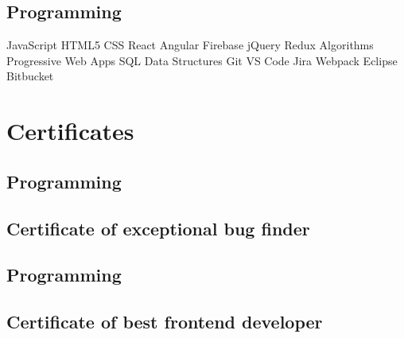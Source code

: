 \documentclass{resumecustom}%
\begin{document}
\begin{minipage}[t]{0.31\textwidth}
\subsection{Programming}
%
\textbf{}%
JavaScript \textbullet{} HTML5 \textbullet{} CSS \textbullet{} React \textbullet{} Angular%
\vspace{5pt}%
\newline%
\textbf{
}%
 \textbullet{} Firebase%
 \textbullet{} jQuery%
 \textbullet{} Redux%
 \textbullet{} Algorithms%
 \textbullet{} Progressive Web Apps%
 \textbullet{} SQL%
 \textbullet{} Data Structures%
\vspace{5pt}%
\newline%
\textbf{
}%
 \textbullet{} Git%
 \textbullet{} VS Code%
 \textbullet{} Jira%
 \textbullet{} Webpack%
 \textbullet{} Eclipse%
 \textbullet{} Bitbucket%
\newline

%
\sectionsep%
\section{Certificates}%
\label{sec:Certificates}%

%
\subsection{Programming}%
\subsection{Certificate of exceptional bug finder}
%
%
\sectionsep%
\subsection{Programming}%
\subsection{Certificate of best frontend developer}
%
%
\sectionsep%
\sectionsep%
\end{minipage}%
\hfill%
\end{document}
